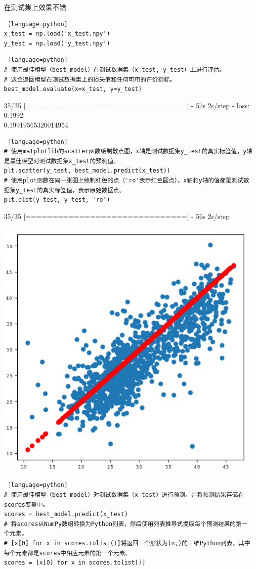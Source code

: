 \documentclass{article}
\begin{document}
在测试集上效果不错
\begin{lstlisting} [language=python]
x_test = np.load('x_test.npy')
y_test = np.load('y_test.npy')
\end{lstlisting}
\begin{lstlisting} [language=python]
# 使用最佳模型（best_model）在测试数据集（x_test, y_test）上进行评估。  
# 这会返回模型在测试数据集上的损失值和任何可用的评价指标。  
best_model.evaluate(x=x_test, y=y_test)
\end{lstlisting}
35/35 [==============================] - 57s 2s/step - loss: 0.1992\\
0.19919565320014954\\
\begin{lstlisting} [language=python]
# 使用matplotlib的scatter函数绘制散点图，x轴是测试数据集y_test的真实标签值，y轴是最佳模型对测试数据集x_test的预测值。  
plt.scatter(y_test, best_model.predict(x_test))  
# 使用plot函数在同一张图上绘制红色的点（'ro'表示红色圆点），x轴和y轴的值都是测试数据集y_test的真实标签值，表示原始数据点。  
plt.plot(y_test, y_test, 'ro')
\end{lstlisting}
35/35 [==============================] - 56s 2s/step\\
[<matplotlib.lines.Line2D at 0x1b6dff97fd0>]\\
\includegraphics[width=0.98\textwidth]{6.png}\\
\begin{lstlisting} [language=python]
# 使用最佳模型（best_model）对测试数据集（x_test）进行预测，并将预测结果存储在scores变量中。  
scores = best_model.predict(x_test)  
# 将scores从NumPy数组转换为Python列表，然后使用列表推导式提取每个预测结果的第一个元素。    
# [x[0] for x in scores.tolist()]将返回一个形状为(n,)的一维Python列表，其中每个元素都是scores中相应元素的第一个元素。  
scores = [x[0] for x in scores.tolist()]
\end{lstlisting}
\end{document}
